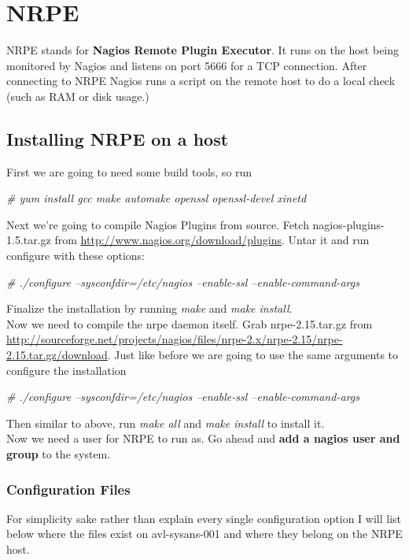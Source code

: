\documentclass[a4paper]{article}
\begin{document}
\section{NRPE}

NRPE stands for \textbf{Nagios Remote Plugin Executor}. It runs on the host being monitored by Nagios and listens on port 5666 for a TCP connection. After connecting to NRPE Nagios runs a script on the remote host to do a local check (such as RAM or disk usage.)

\subsection{Installing NRPE on a host}
First we are going to need some build tools, so run
\begin{center}
	\textit{\# yum install gcc make automake openssl openssl-devel xinetd}
\end{center}
Next we're going to compile Nagios Plugins from source. Fetch nagios-plugins-1.5.tar.gz  from \url{http://www.nagios.org/download/plugins}. Untar it and run configure with these options:
\begin{center}
	\textit{\# ./configure --sysconfdir=/etc/nagios --enable-ssl --enable-command-args}
\end{center}
Finalize the installation by running \textit{make} and \textit{make install}.\\

Now we need to compile the nrpe daemon itself. Grab nrpe-2.15.tar.gz from \url{http://sourceforge.net/projects/nagios/files/nrpe-2.x/nrpe-2.15/nrpe-2.15.tar.gz/download}. Just like before we are going to use the same arguments to configure the installation
\begin{center}
	\textit{\# ./configure --sysconfdir=/etc/nagios --enable-ssl --enable-command-args}
\end{center}
Then similar to above, run \textit{make all} and \textit{make install} to install it.\\

Now we need a user for NRPE to run as. Go ahead and \textbf{add a nagios user and group} to the system. 

\subsubsection{Configuration Files}
For simplicity sake rather than explain every single configuration option I will list below where the files exist on avl-sysans-001 and where they belong on the NRPE host.\\
\end{document}
